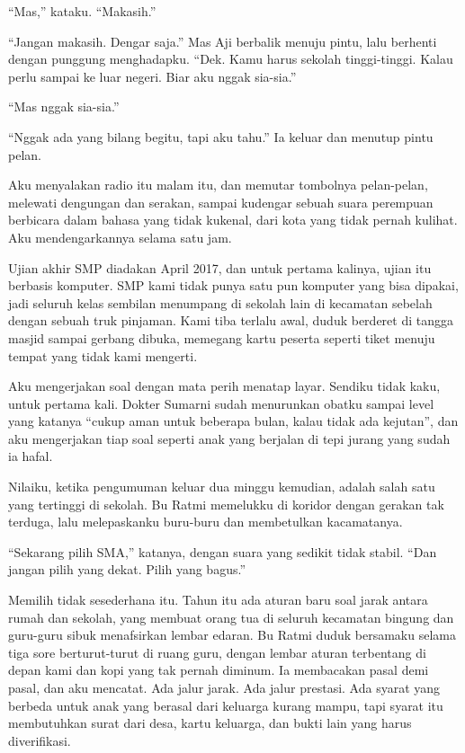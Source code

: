 \documentclass[11pt,twoside,openany]{book}
\makeatletter
\newcommand{\scenebreak}{\par\vspace{0.9em}{\centering\textsc{*\hspace{0.7em}*\hspace{0.7em}*}\par}\vspace{0.9em}\@afterindentfalse\@afterheading}
\makeatother
\begin{document}
``Mas,'' kataku. ``Makasih.''

``Jangan makasih. Dengar saja.'' Mas Aji berbalik menuju pintu, lalu berhenti dengan punggung menghadapku. ``Dek. Kamu harus sekolah tinggi-tinggi. Kalau perlu sampai ke luar negeri. Biar aku nggak sia-sia.''

``Mas nggak sia-sia.''

``Nggak ada yang bilang begitu, tapi aku tahu.'' Ia keluar dan menutup pintu pelan.

Aku menyalakan radio itu malam itu, dan memutar tombolnya pelan-pelan, melewati dengungan dan serakan, sampai kudengar sebuah suara perempuan berbicara dalam bahasa yang tidak kukenal, dari kota yang tidak pernah kulihat. Aku mendengarkannya selama satu jam.

\scenebreak
Ujian akhir SMP diadakan April 2017, dan untuk pertama kalinya, ujian itu berbasis komputer. SMP kami tidak punya satu pun komputer yang bisa dipakai, jadi seluruh kelas sembilan menumpang di sekolah lain di kecamatan sebelah dengan sebuah truk pinjaman. Kami tiba terlalu awal, duduk berderet di tangga masjid sampai gerbang dibuka, memegang kartu peserta seperti tiket menuju tempat yang tidak kami mengerti.

Aku mengerjakan soal dengan mata perih menatap layar. Sendiku tidak kaku, untuk pertama kali. Dokter Sumarni sudah menurunkan obatku sampai level yang katanya ``cukup aman untuk beberapa bulan, kalau tidak ada kejutan'', dan aku mengerjakan tiap soal seperti anak yang berjalan di tepi jurang yang sudah ia hafal.

Nilaiku, ketika pengumuman keluar dua minggu kemudian, adalah salah satu yang tertinggi di sekolah. Bu Ratmi memelukku di koridor dengan gerakan tak terduga, lalu melepaskanku buru-buru dan membetulkan kacamatanya.

``Sekarang pilih SMA,'' katanya, dengan suara yang sedikit tidak stabil. ``Dan jangan pilih yang dekat. Pilih yang bagus.''

Memilih tidak sesederhana itu. Tahun itu ada aturan baru soal jarak antara rumah dan sekolah, yang membuat orang tua di seluruh kecamatan bingung dan guru-guru sibuk menafsirkan lembar edaran. Bu Ratmi duduk bersamaku selama tiga sore berturut-turut di ruang guru, dengan lembar aturan terbentang di depan kami dan kopi yang tak pernah diminum. Ia membacakan pasal demi pasal, dan aku mencatat. Ada jalur jarak. Ada jalur prestasi. Ada syarat yang berbeda untuk anak yang berasal dari keluarga kurang mampu, tapi syarat itu membutuhkan surat dari desa, kartu keluarga, dan bukti lain yang harus diverifikasi.
\end{document}
